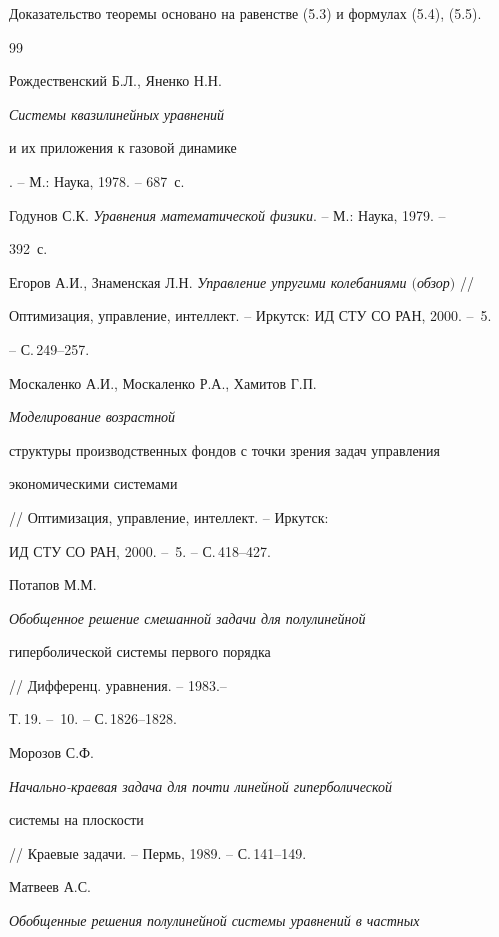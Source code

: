Доказательство теоремы основано на равенстве (5.3) и формулах (5.4), (5.5).








\begin{thebibliography}{99}







Рождественский Б.Л., Яненко Н.Н. {\em Системы квазилинейных уравнений


и их приложения к газовой динамике}. -- М.: Наука, 1978. -- 687~с.




Годунов С.К. {\em Уравнения математической физики}. -- М.: Наука, 1979. -- 


392~с.




Егоров А.И., Знаменская Л.Н. {\em Управление упругими колебаниями $($обзор$)$} //


Оптимизация, управление, интеллект. -- Иркутск: ИД СТУ СО РАН, 2000. -- \No\,5.


-- С.\,249--257.




Москаленко А.И., Москаленко Р.А., Хамитов Г.П. {\em Моделирование возрастной 


структуры производственных фондов с точки зрения задач управления 


экономическими системами} // Оптимизация, управление, интеллект. -- Иркутск: 


ИД СТУ СО РАН, 2000. -- \No\,5. -- С.\,418--427.




Потапов М.М. {\em Обобщенное решение смешанной задачи для полулинейной


гиперболической системы первого порядка} // Дифференц. уравнения. -- 1983.--


Т.\,19. -- \No\,10. -- С.\,1826--1828.




Морозов С.Ф. {\em Начально-краевая задача для почти линейной гиперболической 


системы на плоскости} // Краевые задачи. -- Пермь, 1989. -- С.\,141--149.




Матвеев А.С. {\em Обобщенные решения полулинейной системы уравнений в частных


}
\end{thebibliography}
